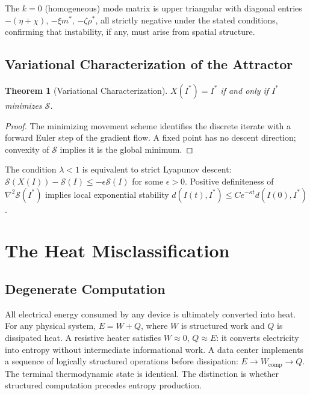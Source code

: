 \documentclass[10pt,twocolumn]{article}
\theoremstyle{plain}
\newtheorem{theorem}{Theorem}
\theoremstyle{definition}
\theoremstyle{remark}
\begin{document}
The $k = 0$ (homogeneous) mode matrix is upper triangular with diagonal
entries $-(\eta+\chi)$, $-\xi m^*$, $-\zeta\rho^*$, all strictly
negative under the stated conditions, confirming that instability, if
any, must arise from spatial structure.

\subsection{Variational Characterization of the Attractor}

\begin{theorem}[Variational Characterization]
$X(I^*) = I^*$ if and only if $I^*$ minimizes $\mathcal{S}$.
\end{theorem}

\begin{proof}
The minimizing movement scheme identifies the discrete iterate with a
forward Euler step of the gradient flow. A fixed point has no descent
direction; convexity of $\mathcal{S}$ implies it is the global minimum.
\end{proof}

The condition $\lambda < 1$ is equivalent to strict Lyapunov descent:
$\mathcal{S}(X(I)) - \mathcal{S}(I) \leq -\epsilon\mathcal{S}(I)$ for
some $\epsilon > 0$. Positive definiteness of $\nabla^2\mathcal{S}(I^*)$
implies local exponential stability $d(I(t), I^*) \leq C e^{-\kappa t}
d(I(0), I^*)$.

\section{The Heat Misclassification}

\subsection{Degenerate Computation}

All electrical energy consumed by any device is ultimately converted
into heat. For any physical system, $E = W + Q$, where $W$ is structured
work and $Q$ is dissipated heat. A resistive heater satisfies $W
\approx 0$, $Q \approx E$: it converts electricity into entropy without
intermediate informational work. A data center implements a sequence of
logically structured operations before dissipation: $E \to
W_{\mathrm{comp}} \to Q$. The terminal thermodynamic state is
identical. The distinction is whether structured computation precedes
entropy production.
\end{document}
